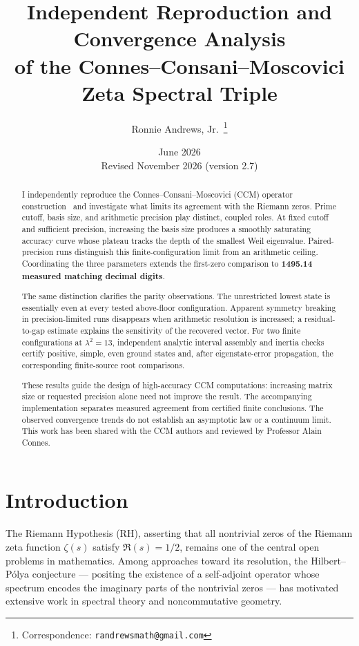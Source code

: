\documentclass[11pt,a4paper]{article}
\title{Independent Reproduction and Convergence Analysis\\
of the Connes--Consani--Moscovici Zeta Spectral Triple}
\author{Ronnie Andrews, Jr.\,\orcidlink{0009-0003-9724-3104}%
\thanks{Correspondence: \texttt{randrewsmath@gmail.com}}}
\date{June 2026\\[2pt]{\small Revised November 2026 (version 2.7)}}
\begin{document}
\maketitle

\begin{abstract}
I independently reproduce the Connes--Consani--Moscovici (CCM)
operator construction~\cite{CCM2025} and investigate what limits its
agreement with the Riemann zeros. Prime cutoff, basis size, and
arithmetic precision play distinct, coupled roles. At fixed cutoff
and sufficient precision, increasing the basis size produces a
smoothly saturating accuracy curve whose plateau tracks the depth
of the smallest Weil eigenvalue. Paired-precision runs distinguish
this finite-configuration limit from an arithmetic ceiling. Coordinating
the three parameters extends the first-zero comparison to
\textbf{1495.14 measured matching decimal digits}.

The same distinction clarifies the parity observations. The
unrestricted lowest state is essentially even at every tested
above-floor configuration. Apparent symmetry breaking in
precision-limited runs disappears when arithmetic resolution is
increased; a residual-to-gap estimate explains the sensitivity of
the recovered vector. For two finite configurations at $\lambda^2=13$,
independent analytic interval assembly and inertia checks certify
positive, simple, even ground states and, after eigenstate-error
propagation, the corresponding finite-source root comparisons.

These results guide the design of high-accuracy CCM computations:
increasing matrix size or requested precision alone need not improve
the result. The accompanying implementation separates measured
agreement from certified finite conclusions. The observed convergence
trends do not establish an asymptotic law or a continuum limit.
This work has been shared with the CCM authors and reviewed by
Professor Alain Connes.
\end{abstract}

\section{Introduction}

The Riemann Hypothesis (RH), asserting that all nontrivial zeros
of the Riemann zeta function $\zeta(s)$ satisfy $\Re(s) = 1/2$,
remains one of the central open problems in mathematics. Among
approaches toward its resolution, the Hilbert--P\'olya conjecture
--- positing the existence of a self-adjoint operator whose
spectrum encodes the imaginary parts of the nontrivial zeros ---
has motivated extensive work in spectral theory and noncommutative
geometry.
\end{document}
